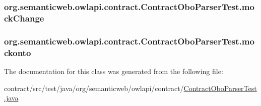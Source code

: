 \hypertarget{classorg_1_1semanticweb_1_1owlapi_1_1contract_1_1_contract_obo_parser_test_a3f77eaafd171f6a628ba5dd0b31de7f3}{
\subsubsection[{mock\-Change}]{ org.\-semanticweb.\-owlapi.\-contract.\-Contract\-Obo\-Parser\-Test.\-mock\-Change\hspace{0.3cm}{\ttfamily [private]}}}\label{classorg_1_1semanticweb_1_1owlapi_1_1contract_1_1_contract_obo_parser_test_a3f77eaafd171f6a628ba5dd0b31de7f3}
\hypertarget{classorg_1_1semanticweb_1_1owlapi_1_1contract_1_1_contract_obo_parser_test_a6cb2689aa9f0a51df531f7985206aa6e}{
\subsubsection[{mockonto}]{ org.\-semanticweb.\-owlapi.\-contract.\-Contract\-Obo\-Parser\-Test.\-mockonto\hspace{0.3cm}{\ttfamily [private]}}}\label{classorg_1_1semanticweb_1_1owlapi_1_1contract_1_1_contract_obo_parser_test_a6cb2689aa9f0a51df531f7985206aa6e}


The documentation for this class was generated from the following file\-:\begin{DoxyCompactItemize}
\item 
contract/src/test/java/org/semanticweb/owlapi/contract/\hyperlink{_contract_obo_parser_test_8java}{Contract\-Obo\-Parser\-Test.\-java}\end{DoxyCompactItemize}
